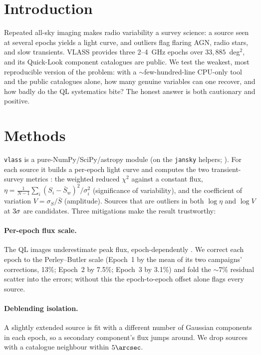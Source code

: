 \documentclass[twocolumn]{aastex631}
\newcommand{\code}[1]{\texttt{#1}}
\begin{document}

\section{Introduction}
Repeated all-sky imaging makes radio variability a survey science: a source seen at several epochs
yields a light curve, and outliers flag flaring AGN, radio stars, and slow transients. VLASS
\citep{lacy2020} provides three 2--4~GHz epochs over $33{,}885$~deg$^2$, and its Quick-Look component
catalogues \citep{gordon2021} are public. We test the weakest, most reproducible version of the
problem: with a $\sim$few-hundred-line CPU-only tool and the public catalogues alone, how many
genuine variables can one recover, and how badly do the QL systematics bite? The honest answer is
both cautionary and positive.

\section{Methods}
\code{vlass} is a pure-NumPy/SciPy/astropy module (on the \code{jansky} helpers; \citealt{jansky}).
For each source it builds a per-epoch light curve and computes the two transient-survey metrics
\citep{swinbank2015, rowlinson2019}: the weighted reduced $\chi^2$ against a constant flux,
$\eta = \frac{1}{N-1}\sum_i (S_i-\bar S_w)^2/\sigma_i^2$ (significance of variability), and the
coefficient of variation $V=\sigma_S/\bar S$ (amplitude). Sources that are outliers in both
$\log\eta$ and $\log V$ at $3\sigma$ are candidates. Three mitigations make the result
trustworthy:

\paragraph{Per-epoch flux scale.} The QL images underestimate peak flux, epoch-dependently
\citep{vlassmemo13, vlassmemo22}. We correct each epoch to the Perley--Butler scale (Epoch~1 by
the mean of its two campaigns' corrections, 13\%; Epoch~2 by 7.5\%; Epoch~3 by 3.1\%) and fold the
$\sim$7\% residual scatter into the errors; without this the epoch-to-epoch offset alone flags
every source.

\paragraph{Deblending isolation.} A slightly extended source is fit with a different number of
Gaussian components in each epoch, so a secondary component's flux jumps around. We drop sources with
a catalogue neighbour within $5\arcsec$.
\end{document}
